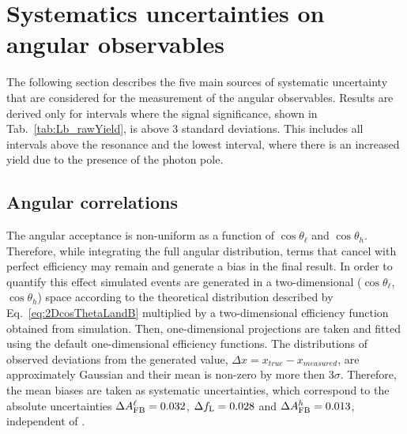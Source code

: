 \section{Systematics uncertainties on angular observables}
\label{sec:ang_results}

The following section describes the five main sources of systematic uncertainty
that are considered for the measurement of the angular observables.
Results are derived only for \qsq intervals
where the signal significance, shown in Tab.~\ref{tab:Lb_rawYield}, is above 3 standard
deviations. This includes all \qsq intervals above the \jpsi resonance and the lowest 
\qsq interval, where there is an increased yield due to the presence of the photon pole.



\subsection{Angular correlations}

The angular acceptance is non-uniform as a function of $\cos\theta_\ell$ and $\cos \theta_h$.
Therefore, while integrating the full angular distribution, terms that cancel with perfect efficiency
may remain and generate a bias in the final result. In order to quantify this effect simulated events are
generated in a two-dimensional ($\cos\theta_\ell$,$\cos \theta_h$) space according to the
theoretical distribution described by Eq.~\ref{eq:2DcosThetaLandB} multiplied by a two-dimensional
efficiency function obtained from simulation. %
Then, one-dimensional projections are taken and fitted using the default one-dimensional efficiency functions.
The distributions of observed deviations from the generated value, $\Delta x = x_{true} - x_{measured}$,
are approximately Gaussian and their mean is non-zero by more then 3$\sigma$.
Therefore, the mean biases are taken as systematic uncertainties, which correspond to the absolute 
uncertainties $\Delta A_{\rm FB}^\ell = 0.032$, $\Delta f_{\rm L} = 0.028$ and $\Delta A_{\rm FB}^h = 0.013$, independent of \qsq.

